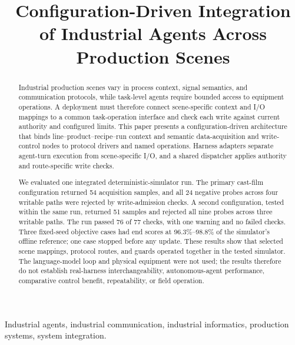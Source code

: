 \documentclass[journal]{IEEEtran}
\begin{document}

\title{Configuration-Driven Integration of Industrial Agents Across Production Scenes}

\author{}

\maketitle

\begin{abstract}
Industrial production scenes vary in process context, signal semantics, and
communication protocols, while task-level agents require bounded access to
equipment operations. A deployment must therefore connect scene-specific
context and I/O mappings to a common task-operation interface and check each
write against current authority and configured limits. This paper presents a
configuration-driven architecture that binds line--product--recipe--run
context and semantic data-acquisition and write-control nodes to protocol
drivers and named operations. Harness adapters separate agent-turn execution
from scene-specific I/O, and a shared dispatcher applies authority and
route-specific write checks.

We evaluated one integrated deterministic-simulator run. The primary
cast-film configuration returned 54 acquisition samples, and all 24 negative
probes across four writable paths were rejected by write-admission checks. A
second configuration, tested within the same run, returned 51 samples and
rejected all nine probes across three writable paths. The run passed 76 of 77
checks, with one warning and no failed checks. Three fixed-seed objective
cases had end scores at 96.3\%--98.8\% of the simulator's offline reference;
one case stopped before any update. These results show that selected scene
mappings, protocol routes, and guards operated together in the tested
simulator. The language-model loop and physical equipment were not used; the
results therefore do not establish real-harness interchangeability,
autonomous-agent performance, comparative control benefit, repeatability, or
field operation.
\end{abstract}

\begin{IEEEkeywords}
Industrial agents, industrial communication, industrial informatics,
production systems, system integration.
\end{IEEEkeywords}

\IEEEpeerreviewmaketitle








\balance


\end{document}
